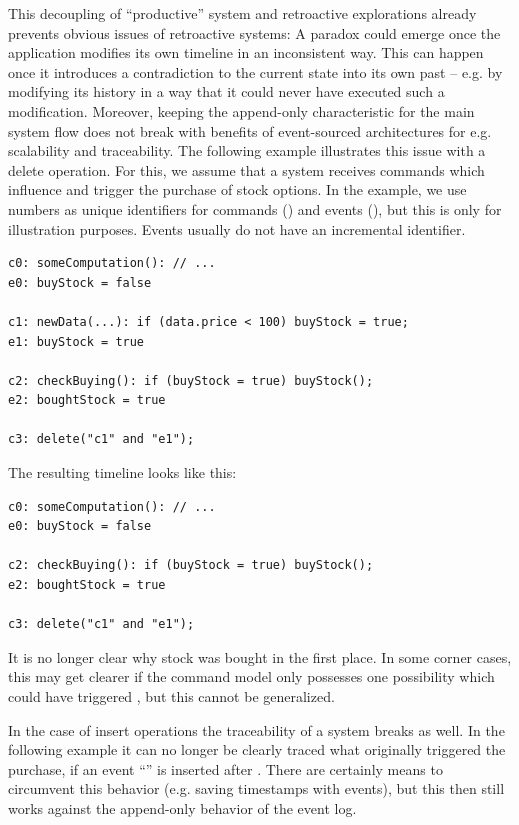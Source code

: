 This decoupling of ``productive'' system and retroactive explorations already 
prevents obvious issues of retroactive systems: A paradox could emerge once the 
application modifies its own timeline in an inconsistent way. This can happen 
once it introduces a contradiction to the current state into its own past -- e.g. 
by modifying its history in a way that it could never have executed such a 
modification. Moreover, keeping the append-only characteristic for the main 
system flow does not break with benefits of event-sourced architectures for e.g. 
scalability and traceability.
The following example illustrates this issue with a delete operation. For this, 
we assume that a system receives commands which influence and trigger the purchase 
of stock options. 
In the example, we use numbers as unique identifiers for commands ()
and events (), but this is only for illustration purposes. Events usually 
do not have an incremental identifier.

\begin{lstlisting}[style=styled]
c0: someComputation(): // ...
e0: buyStock = false

c1: newData(...): if (data.price < 100) buyStock = true;
e1: buyStock = true

c2: checkBuying(): if (buyStock = true) buyStock();
e2: boughtStock = true

c3: delete("c1" and "e1"); 
\end{lstlisting}

The resulting timeline looks like this:

\begin{lstlisting}[style=styled]
c0: someComputation(): // ...
e0: buyStock = false

c2: checkBuying(): if (buyStock = true) buyStock();
e2: boughtStock = true

c3: delete("c1" and "e1"); 
\end{lstlisting}

It is no longer clear why stock was bought in the first place. In some corner 
cases, this may get clearer if the command model only possesses one possibility 
which could have triggered , but this cannot be generalized.

In the case of insert operations the traceability of a system breaks as well. 
In the following example it can no longer be clearly traced what originally 
triggered the purchase, if an event ``'' is inserted after 
. There are certainly means to circumvent this behavior (e.g. saving 
timestamps with events), but this then still works against the append-only 
behavior of the event log.

